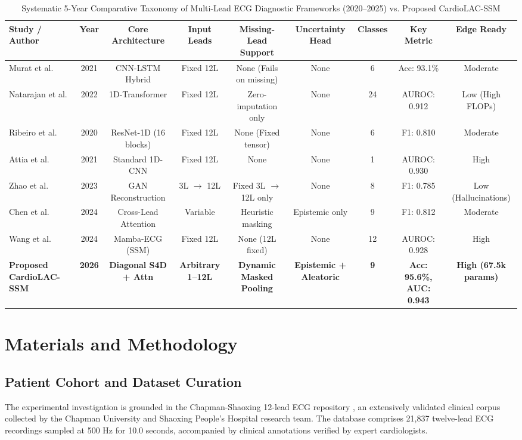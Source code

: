 \documentclass[journal]{IEEEtran}
\begin{document}
\begin{table}[!t]
\caption{Systematic 5-Year Comparative Taxonomy of Multi-Lead ECG Diagnostic Frameworks (2020--2025) vs. Proposed CardioLAC-SSM}
\label{tab_lit_comparison}
\centering
\begin{tabularx}{\textwidth}{lcccccccc}
\toprule
\textbf{Study / Author} & \textbf{Year} & \textbf{Core Architecture} & \textbf{Input Leads} & \textbf{Missing-Lead Support} & \textbf{Uncertainty Head} & \textbf{Classes} & \textbf{Key Metric} & \textbf{Edge Ready} \\
\midrule
Murat et al. \cite{ref_7} & 2021 & CNN-LSTM Hybrid & Fixed 12L & None (Fails on missing) & None & 6 & Acc: 93.1\% & Moderate \\
Natarajan et al. \cite{ref_8} & 2022 & 1D-Transformer & Fixed 12L & Zero-imputation only & None & 24 & AUROC: 0.912 & Low (High FLOPs) \\
Ribeiro et al. \cite{ref_9} & 2020 & ResNet-1D (16 blocks) & Fixed 12L & None (Fixed tensor) & None & 6 & F1: 0.810 & Moderate \\
Attia et al. \cite{ref_10} & 2021 & Standard 1D-CNN & Fixed 12L & None & None & 1 & AUROC: 0.930 & High \\
Zhao et al. \cite{ref_25} & 2023 & GAN Reconstruction & 3L $\to$ 12L & Fixed 3L $\to$ 12L only & None & 8 & F1: 0.785 & Low (Hallucinations) \\
Chen et al. \cite{ref_26} & 2024 & Cross-Lead Attention & Variable & Heuristic masking & Epistemic only & 9 & F1: 0.812 & Moderate \\
Wang et al. \cite{ref_28} & 2024 & Mamba-ECG (SSM) & Fixed 12L & None (12L fixed) & None & 12 & AUROC: 0.928 & High \\
\midrule
\textbf{Proposed CardioLAC-SSM} & \textbf{2026} & \textbf{Diagonal S4D + Attn} & \textbf{Arbitrary 1--12L} & \textbf{Dynamic Masked Pooling} & \textbf{Epistemic + Aleatoric} & \textbf{9} & \textbf{Acc: 95.6\%, AUC: 0.943} & \textbf{High (67.5k params)} \\
\bottomrule
\end{tabularx}
\end{table}

\section{Materials and Methodology}
\subsection{Patient Cohort and Dataset Curation}
The experimental investigation is grounded in the Chapman-Shaoxing 12-lead ECG repository \cite{ref_32,ref_33}, an extensively validated clinical corpus collected by the Chapman University and Shaoxing People's Hospital research team. The database comprises 21,837 twelve-lead ECG recordings sampled at 500 Hz for 10.0 seconds, accompanied by clinical annotations verified by expert cardiologists.
\end{document}
